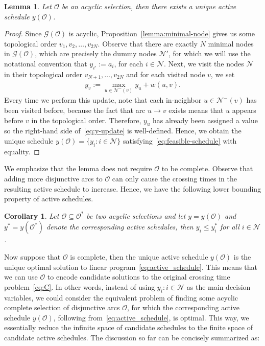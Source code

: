 \documentclass{report}
\theoremstyle{definition}
\theoremstyle{plain}
\newtheorem{lemma}{Lemma}[chapter]
\newtheorem{corollary}{Corollary}[chapter]
\begin{document}
\begin{lemma}\label{lemma:unique-active-schedule}
  Let $\mathcal{O}$ be an acyclic selection, then there exists a unique active
  schedule $y(\mathcal{O})$.
\end{lemma}
\begin{proof}
  Since $\mathcal{G}(\mathcal{O})$ is acyclic, Proposition~\ref{lemma:minimal-node} gives us
  some topological order $v_1, v_2, \dots, v_{2N}$.
  Observe that there are exactly $N$ minimal nodes in
  $\mathcal{G}(\mathcal{O})$, which are precisely the dummy nodes
  $\mathcal{N}'$, for which we will use the notational convention that
  $y_{i'} := a_i$, for each $i \in \mathcal{N}$.
  Next, we visit the nodes $\mathcal{N}$ in their topological order
  $v_{N+1}, \dots, v_{2N}$ and for each visited node $v$, we set
  \begin{align}
    \label{eq:y-update}
   y_{v} := \max_{u \in \mathcal{N}^-(v)} y_{u} + w(u,v) .
  \end{align}
  Every time we perform this update, note that each in-neighbor
  $u \in \mathcal{N}^-(v)$ has been visited before, because the fact that arc
  $u \rightarrow v$ exists means that $u$ appears before $v$ in the topological order.
  Therefore, $y_{u}$ has already been assigned a value so the right-hand side
  of~\eqref{eq:y-update} is well-defined. Hence, we obtain the unique schedule
  $y(\mathcal{O}) = \{ y_i : i \in \mathcal{N} \}$ satisfying~\eqref{eq:feasible-schedule} with equality.
\end{proof}

We emphasize that the lemma does not require $\mathcal{O}$ to be complete.
Observe that adding more disjunctive arcs to $\mathcal{O}$ can only cause the
crossing times in the resulting active schedule to increase. Hence, we have the
following lower bounding property of active schedules.
%
\begin{corollary}
  \label{lower-bounds}
  Let $\mathcal{O} \subseteq \mathcal{O}^*$ be two acyclic selections and let
  $y = y(\mathcal{O})$ and $y^* = y(\mathcal{O}^{*})$ denote the corresponding
  active schedules, then $y_i \leq y^{*}_i$ for all $i \in \mathcal{N}$.
\end{corollary}


Now suppose that $\mathcal{O}$ is complete, then the unique active schedule
$y(\mathcal{O})$ is the unique optimal solution to linear program~\eqref{eq:active_schedule}.
%
This means that we can use $\mathcal{O}$ to encode candidate solutions to the
original crossing time problem~\eqref{eq:C}.
%
In other words, instead of using $y_i : i \in \mathcal{N}$ as the main decision
variables, we could consider the equivalent problem of finding some acyclic
complete selection of disjunctive arcs $\mathcal{O}$, for which the
corresponding active schedule $y(\mathcal{O})$, following from~\eqref{eq:active_schedule}, is optimal.
%
This way, we essentially reduce the infinite space of candidate schedules to
the finite space of candidate active schedules.
%
The discussion so far can be concisely summarized as:
\end{document}
